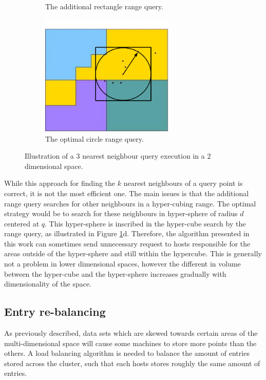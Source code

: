 \documentclass[11pt,a4paper]{globis-book}
\begin{document}
\begin{figure}[h]
\begin{subfigure}[b]{0.4\linewidth}
        \caption{The additional rectangle range query.}
    \end{subfigure}%
    \qquad
    \begin{subfigure}[b]{0.4\linewidth}
        \includegraphics[width = 2.5in]{images/zordering-knn-d}
        \caption{The optimal circle range query.}
    \end{subfigure}
    \caption{Illustration of a 3 nearest neighbour query execution in a 2 dimensional space. }
    \label{fig:knn}
\end{figure}

While this approach for finding the $k$ nearest neighbours of a query point is correct, it is not the most efficient one. The main issues is that the additional range query searches for other neighbours in a hyper-cubing range. The optimal strategy would be to search for these neighbours in hyper-sphere of radius $d$ centered at $q$. This hyper-sphere is inscribed in the hyper-cube search by the range query, as illustrated in Figure \ref{fig:knn}d. Therefore, the algorithm presented in this work can sometimes send unnecessary request to hosts responsible for the areas outside of the hyper-sphere and still within the hypercube. This is generally not a problem in lower dimensional spaces, however the different in volume between the hyper-cube and the hyper-sphere increases gradually with dimensionality of the space. 

\subsection{Entry re-balancing}

As previously described, data sets which are skewed towards certain areas of the multi-dimensional space will cause some machines to store more points than the others. A load balancing algorithm is needed to balance the amount of entries stored across the cluster, such that each hosts stores roughly the same amount of entries. 
\end{document}
